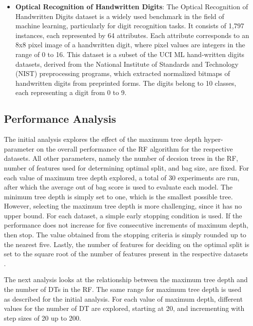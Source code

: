 \documentclass[conference]{IEEEtran}
\begin{document}
\begin{itemize}
        \item \textbf{Optical Recognition of Handwritten Digits}: The Optical Recognition of Handwritten Digits dataset is a 
        widely used benchmark in the field of machine learning, particularly for digit recognition tasks. It consists of 1,797 
        instances, each represented by 64 attributes. Each attribute corresponds to an 8x8 pixel image of a handwritten digit, 
        where pixel values are integers in the range of 0 to 16. This dataset is a subset of the UCI ML hand-written digits datasets, 
        derived from the National Institute of Standards and Technology (NIST) preprocessing programs, which extracted normalized 
        bitmaps of handwritten digits from preprinted forms. The digits belong to 10 classes, each representing a digit from 0 to 9.
    \end{itemize}


    \subsection{Performance Analysis}

        The initial analysis explores the effect of the maximum tree depth hyper-parameter on the overall performance of the RF algorithm
        for the respective datasets. All other parameters, namely the number of decsion trees in the RF, number of features used for determining optimal
        split, and bag size, are fixed. For each value of maximum tree depth explored, a total of 30 experiments are run, after which the average out
        of bag score is used to evaluate each model. The minimum tree depth is simply set to one, which is the smallest possible tree. However, selecting
        the maximum tree depth is more challenging, since it has no upper bound. For each dataset, a simple early stopping condition is used.
        If the performance does not increase for five consecutive increments of maximum depth, then stop. The value obtained from the stopping
        criteria is simply rounded up to the nearest five. Lastly, the number of features for deciding on the optimal split is set to the square
        root of the number of features present in the respective datasets \cite{hastie2001elements}.

        The next analysis looks at the relationship between the maximum tree depth and the number of DTs in the RF. The same range for maximum
        tree depth is used as described for the initial analysis. For each value of maximum depth, different values for the number of DT are explored,
        starting at 20, and incrementing with step sizes of 20 up to 200. 
\end{document}

